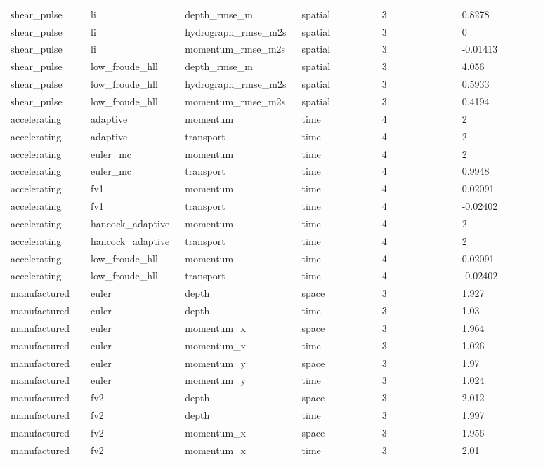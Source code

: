 \begin{longtable}{p{0.1467\linewidth}p{0.1467\linewidth}p{0.1467\linewidth}p{0.1467\linewidth}p{0.1467\linewidth}p{0.1467\linewidth}}
shear\_pulse & li & depth\_rmse\_m & spatial & 3 & 0.8278 \\
shear\_pulse & li & hydrograph\_rmse\_m2s & spatial & 3 & 0 \\
shear\_pulse & li & momentum\_rmse\_m2s & spatial & 3 & -0.01413 \\
shear\_pulse & low\_froude\_hll & depth\_rmse\_m & spatial & 3 & 4.056 \\
shear\_pulse & low\_froude\_hll & hydrograph\_rmse\_m2s & spatial & 3 & 0.5933 \\
shear\_pulse & low\_froude\_hll & momentum\_rmse\_m2s & spatial & 3 & 0.4194 \\
accelerating & adaptive & momentum & time & 4 & 2 \\
accelerating & adaptive & transport & time & 4 & 2 \\
accelerating & euler\_mc & momentum & time & 4 & 2 \\
accelerating & euler\_mc & transport & time & 4 & 0.9948 \\
accelerating & fv1 & momentum & time & 4 & 0.02091 \\
accelerating & fv1 & transport & time & 4 & -0.02402 \\
accelerating & hancock\_adaptive & momentum & time & 4 & 2 \\
accelerating & hancock\_adaptive & transport & time & 4 & 2 \\
accelerating & low\_froude\_hll & momentum & time & 4 & 0.02091 \\
accelerating & low\_froude\_hll & transport & time & 4 & -0.02402 \\
manufactured & euler & depth & space & 3 & 1.927 \\
manufactured & euler & depth & time & 3 & 1.03 \\
manufactured & euler & momentum\_x & space & 3 & 1.964 \\
manufactured & euler & momentum\_x & time & 3 & 1.026 \\
manufactured & euler & momentum\_y & space & 3 & 1.97 \\
manufactured & euler & momentum\_y & time & 3 & 1.024 \\
manufactured & fv2 & depth & space & 3 & 2.012 \\
manufactured & fv2 & depth & time & 3 & 1.997 \\
manufactured & fv2 & momentum\_x & space & 3 & 1.956 \\
manufactured & fv2 & momentum\_x & time & 3 & 2.01 \\

\end{longtable}
